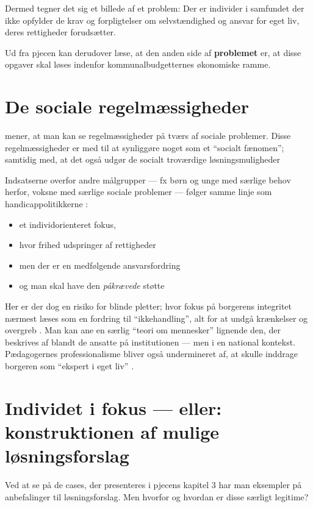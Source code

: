 Dermed tegner det sig et billede af et problem: Der er individer i samfundet der ikke opfylder de krav og forpligtelser om selvstændighed og ansvar for eget liv, deres rettigheder forudsætter.

Ud fra pjecen kan derudover læse, at den anden side af \textbf{problemet} er, at disse opgaver skal løses indenfor kommunalbudgetternes økonomiske ramme.

\section{De sociale regelmæssigheder}

\citeauthor{scheurichPolicyArchaeologyNew1994} mener, at man kan se regelmæssigheder på tværs af sociale problemer.
Disse regelmæssigheder er med til at synliggøre noget som et “socialt fænomen”; samtidig med, at det også udgør de socialt troværdige løsningsmuligheder \autocite[s. 301]{scheurichPolicyArchaeologyNew1994}

Indsatserne overfor andre målgrupper — fx børn og unge med særlige behov herfor, voksne med særlige sociale problemer — følger samme linje som handicappolitikkerne \autocite[Kap. 6, 15]{social-ogindenrigsministerietBekendtgorelseAfLov2019}:
\begin{itemize}
  \item
    et individorienteret fokus, 
  \item
    hvor frihed udspringer af rettigheder
  \item
    men der er en medfølgende ansvarsfordring
  \item
    og man skal have den \textit{påkrævede} støtte
\end{itemize}

Her er der dog en risiko for blinde pletter; hvor fokus på borgerens integritet  nærmest læses som en fordring til “ikkehandling”, alt for at undgå krænkelser og overgreb \autocite{langagerDetAfmalteLiv2013}.
Man kan ane en særlig “teori om mennesker” lignende den, der beskrives af \citeauthor{goffmanAsylumsEssaysSocial1991} blandt de ansatte på institutionen — men i en national kontekst.
Pædagogernes professionalisme bliver også undermineret af, at skulle inddrage borgeren som “ekspert i eget liv” \autocite{mik-meyerIndledningSkabeProfessionel2012}.

\section{Individet i fokus — eller: konstruktionen af mulige løsningsforslag}
Ved at se på de cases, der presenteres i pjecens kapitel 3 har man eksempler på anbefalinger til løsningsforslag.
Men hvorfor og hvordan er disse særligt legitime? 

